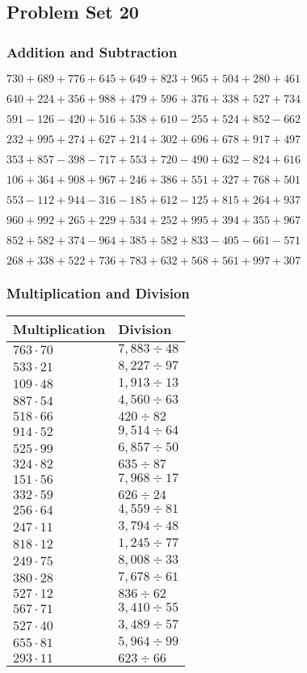 \hypertarget{problem-set-20-2}{%
\subsection{Problem Set 20}\label{problem-set-20-2}}

\hypertarget{addition-and-subtraction-120}{%
\subsubsection{Addition and
Subtraction}\label{addition-and-subtraction-120}}

\(730 + 689 + 776 + 645 + 649 + 823 + 965 + 504 + 280 + 461\)

\(640 + 224 + 356 + 988 + 479 + 596 + 376 + 338 + 527 + 734\)

\(591 - 126 - 420 + 516 + 538 + 610 - 255 + 524 + 852 - 662\)

\(232 + 995 + 274 + 627 + 214 + 302 + 696 + 678 + 917 + 497\)

\(353 + 857 - 398 - 717 + 553 + 720 - 490 + 632 - 824 + 616\)

\(106 + 364 + 908 + 967 + 246 + 386 + 551 + 327 + 768 + 501\)

\(553 - 112 + 944 - 316 - 185 + 612 - 125 + 815 + 264 + 937\)

\(960 + 992 + 265 + 229 + 534 + 252 + 995 + 394 + 355 + 967\)

\(852 + 582 + 374 - 964 + 385 + 582 + 833 - 405 - 661 - 571\)

\(268 + 338 + 522 + 736 + 783 + 632 + 568 + 561 + 997 + 307\)

\hypertarget{multiplication-and-division-120}{%
\subsubsection{Multiplication and
Division}\label{multiplication-and-division-120}}

\begin{longtable}[]{@{}ll@{}}
\toprule
Multiplication & Division\tabularnewline
\midrule
\endhead
\(763 \cdot 70\) & \(7,883÷48\)\tabularnewline
\(533 \cdot 21\) & \(8,227÷97\)\tabularnewline
\(109 \cdot 48\) & \(1,913÷13\)\tabularnewline
\(887 \cdot 54\) & \(4,560÷63\)\tabularnewline
\(518 \cdot 66\) & \(420÷82\)\tabularnewline
\(914 \cdot 52\) & \(9,514÷64\)\tabularnewline
\(525 \cdot 99\) & \(6,857÷50\)\tabularnewline
\(324 \cdot 82\) & \(635÷87\)\tabularnewline
\(151 \cdot 56\) & \(7,968÷17\)\tabularnewline
\(332 \cdot 59\) & \(626÷24\)\tabularnewline
\(256 \cdot 64\) & \(4,559÷81\)\tabularnewline
\(247 \cdot 11\) & \(3,794÷48\)\tabularnewline
\(818 \cdot 12\) & \(1,245÷77\)\tabularnewline
\(249 \cdot 75\) & \(8,008÷33\)\tabularnewline
\(380 \cdot 28\) & \(7,678÷61\)\tabularnewline
\(527 \cdot 12\) & \(836÷62\)\tabularnewline
\(567 \cdot 71\) & \(3,410÷55\)\tabularnewline
\(527 \cdot 40\) & \(3,489÷57\)\tabularnewline
\(655 \cdot 81\) & \(5,964÷99\)\tabularnewline
\(293 \cdot 11\) & \(623÷66\)\tabularnewline
\bottomrule
\end{longtable}

